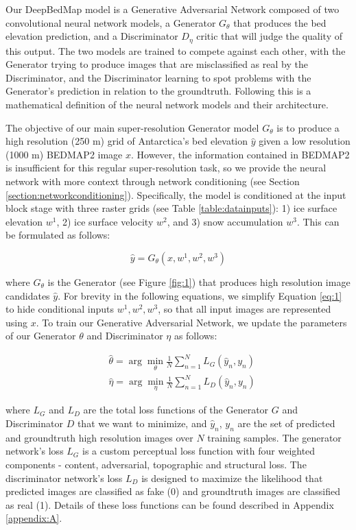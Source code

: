 \documentclass[tc, manuscript]{copernicus}
\begin{document}
Our DeepBedMap model is a Generative Adversarial Network \citep{GoodfellowGenerativeAdversarialNetworks2014} composed of two convolutional neural network models, a Generator $G_\theta$ that produces the bed elevation prediction, and a Discriminator $D_\eta$ critic that will judge the quality of this output.
The two models are trained to compete against each other, with the Generator trying to produce images that are misclassified as real by the Discriminator, and the Discriminator learning to spot problems with the Generator's prediction in relation to the groundtruth.
Following this is a mathematical definition of the neural network models and their architecture.

The objective of our main super-resolution Generator model $G_\theta$ is to produce a high resolution (250 m) grid of Antarctica's bed elevation $\hat{y}$ given a low resolution (1000 m) BEDMAP2 \citep{FretwellBedmap2improvedice2013} image $x$.
However, the information contained in BEDMAP2 is insufficient for this regular super-resolution task, so we provide the neural network with more context through network conditioning (see Section \ref{section:networkconditioning}).
Specifically, the model is conditioned at the input block stage with three raster grids (see Table \ref{table:datainputs}): 1) ice surface elevation $w^1$, 2) ice surface velocity $w^2$, and 3) snow accumulation $w^3$.
This can be formulated as follows:

\begin{equation}\label{eq:1}
  \hat{y} = G_\theta(x, w^1, w^2, w^3)
\end{equation}

where $G_\theta$ is the Generator (see Figure \ref{fig:1}) that produces high resolution image candidates $\hat{y}$.
For brevity in the following equations, we simplify Equation \eqref{eq:1} to hide conditional inputs $w^1, w^2, w^3$, so that all input images are represented using $x$.
To train our Generative Adversarial Network, we update the parameters of our Generator $\theta$ and Discriminator $\eta$ as follows:

\begin{align}
  & \hat{\theta} = \arg\min_{\theta} \frac{1}{N}\sum_{n=1}^{N}L_G(\hat{y}_n, y_n) \label{eq:2}\\
  & \hat{\eta} = \arg\min_{\eta} \frac{1}{N}\sum_{n=1}^{N}L_D(\hat{y}_n, y_n) \label{eq:3}
\end{align}

where $L_G$ and $L_D$ are the total loss functions of the Generator $G$ and Discriminator $D$ that we want to minimize, and $\hat{y}_n$, $y_n$ are the set of predicted and groundtruth high resolution images over $N$ training samples.
The generator network's loss $L_G$ is a custom perceptual loss function with four weighted components - content, adversarial, topographic and structural loss.
The discriminator network's loss $L_D$ is designed to maximize the likelihood that predicted images are classified as fake (0) and groundtruth images are classified as real (1).
Details of these loss functions can be found described in Appendix \ref{appendix:A}.
\end{document}
